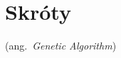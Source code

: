 % 
\chapter*{Skróty}
\label{sec:skroty}
\noindent\vspace{-\topsep-\partopsep-\parsep} %
\begin{description}[labelwidth=*]
  \item [GA] (ang.\ \emph{Genetic Algorithm})

\end{description}
